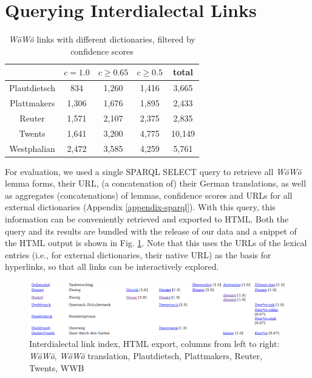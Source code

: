 \section{Querying Interdialectal Links}

\begin{table}
{\small
\begin{tabular}{ccccc}
                & $c=1.0$   & $c\geq 0.65$  & $c \geq 0.5$  & total \\ \hline
Plautdietsch    & 834       & 1,260          & 1,416          & 3,665 \\
Plattmakers     & 1,306     & 1,676          & 1,895          & 2,433 \\
Reuter          & 1,571     & 2,107          & 2,375          & 2,835 \\
Twents          & 1,641     & 3,200          & 4,775          & 10,149\\
Westphalian     & 2,472     & 3,585          & 4,259          & 5,761 \\
\hline
\end{tabular}
} %
\caption{\emph{WöWö} links with different dictionaries, filtered by confidence scores}
\label{tab-results}
\end{table}

For evaluation, we used a single SPARQL SELECT query to retrieve all \emph{WöWö} lemma forms, their URL, (a concatenation of) their German translations, as well as aggregates (concatenations) of lemmas, confidence scores and URLs for all external dictionaries (Appendix \ref{appendix-sparql}). With this query, this information can be conveniently retrieved and exported to HTML. Both the query and its results are bundled with the release of our data and a snippet of the HTML output is shown in Fig. \ref{fig-interdialectal-links-in-html}. Note that this uses the URLs of the lexical entries (i.e., for external dictionaries, their native URL) as the basis for hyperlinks, so that all links can be interactively explored.

\begin{figure}
    \hspace{-0.15cm}\includegraphics[width=1.025\linewidth]{img/html.png}
    \caption{Interdialectal link index, HTML export, columns from left to right: \emph{WöWö}, \emph{WöWö} translation, Plautdietsch, Plattmakers, Reuter, Twents, WWB}
    \label{fig-interdialectal-links-in-html}
\end{figure}

